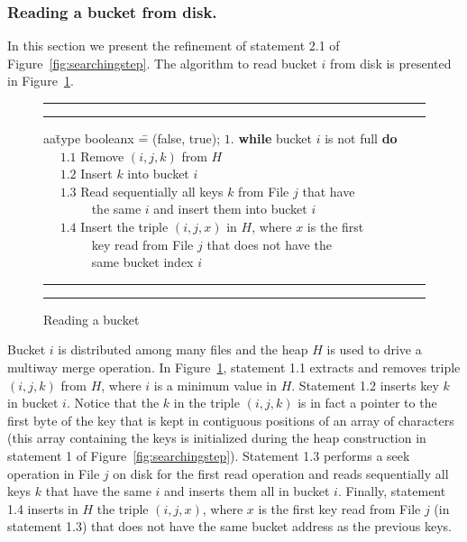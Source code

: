 \vspace{-3mm}
\label{sec:readingbucket}
\subsubsection{Reading a bucket from disk.} 

In this section we present the refinement of statement 2.1 of
Figure~\ref{fig:searchingstep}.
The algorithm to read bucket $i$ from disk is presented 
in Figure~\ref{fig:readingbucket}.

\begin{figure}[h]
\hrule 
\hrule 
\vspace{2mm}
\begin{tabbing}
aa\=type booleanx \==  (false, true); \kill
\> $1.$ {\bf while} bucket $i$ is not full {\bf do} \\
\> ~~ $1.1$ Remove $(i, j, k)$ from $H$\\
\> ~~ $1.2$ Insert $k$ into bucket $i$ \\
\> ~~ $1.3$ Read sequentially all keys $k$ from File $j$ that have \\
\> ~~~~~~~ the same $i$ and insert them into bucket $i$ \\
\> ~~ $1.4$ Insert the triple $(i, j, x)$ in $H$, where $x$ is the first \\
\> ~~~~~~~ key read from File $j$ that does not have the \\ 
\> ~~~~~~~ same bucket index $i$
\end{tabbing}
\hrule 
\hrule 
\vspace{-1.0mm}
\caption{Reading a bucket}
\vspace{-4.0mm}
\label{fig:readingbucket}
\end{figure}

Bucket $i$ is distributed among many files and the heap $H$ is used to drive a
multiway merge operation.
In Figure~\ref{fig:readingbucket}, statement 1.1 extracts and removes triple 
$(i, j, k)$ from $H$, where $i$ is a minimum value in $H$.
Statement 1.2 inserts key $k$ in bucket $i$.
Notice that the $k$ in the triple $(i, j, k)$ is in fact a pointer to
the first byte of the key that is kept in contiguous positions of an array of characters
(this array containing the keys is initialized during the heap construction
in statement 1 of Figure~\ref{fig:searchingstep}).
Statement 1.3 performs a seek operation in File $j$ on disk for the first 
read operation and reads sequentially all keys $k$ that have the same $i$ 
and inserts them all in bucket $i$.
Finally, statement 1.4 inserts in $H$ the triple $(i, j, x)$,  
where $x$ is the first key read from File $j$ (in statement 1.3) 
that does not have the same bucket address as the previous keys.


